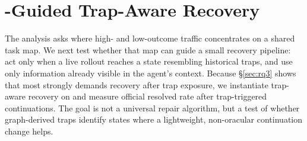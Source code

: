 \section{\method{}-Guided Trap-Aware Recovery}
\label{sec:trap_intervention}

The \method{} analysis asks where high- and low-outcome traffic concentrates on a shared task map.
We next test whether that map can guide a small recovery pipeline: act only when a live rollout reaches a state resembling historical traps, and use only information already visible in the agent's context.
Because \S\ref{sec:rq3} shows that \swe{} most strongly demands recovery after trap exposure, we instantiate trap-aware recovery on \swe{} and measure official resolved rate after trap-triggered continuations.
The goal is not a universal repair algorithm, but a test of whether graph-derived traps identify states where a lightweight, non-oracular continuation change helps.

